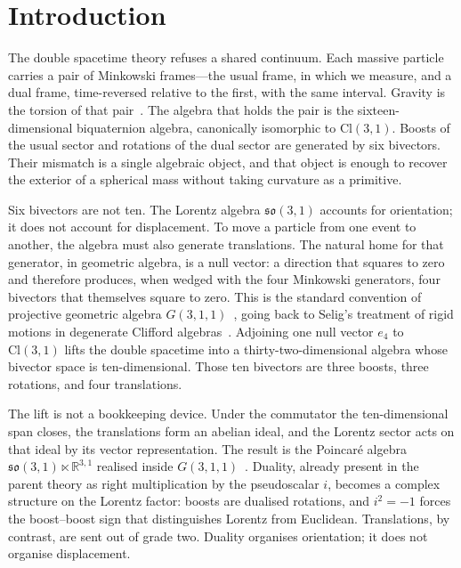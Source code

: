 \documentclass[a4paper]{article}
\begin{document}
\section{Introduction}
\label{sec:introduction}

The double spacetime theory refuses a shared continuum. Each massive particle carries a pair of Minkowski frames---the usual frame, in which we measure, and a dual frame, time-reversed relative to the first, with the same interval. Gravity is the torsion of that pair~\cite{Hestenes2015,DoranLasenby2003}. The algebra that holds the pair is the sixteen-dimensional biquaternion algebra, canonically isomorphic to \(\mathrm{Cl}(3,1)\). Boosts of the usual sector and rotations of the dual sector are generated by six bivectors. Their mismatch is a single algebraic object, and that object is enough to recover the exterior of a spherical mass without taking curvature as a primitive.

Six bivectors are not ten. The Lorentz algebra \(\mathfrak{so}(3,1)\) accounts for orientation; it does not account for displacement. To move a particle from one event to another, the algebra must also generate translations. The natural home for that generator, in geometric algebra, is a null vector: a direction that squares to zero and therefore produces, when wedged with the four Minkowski generators, four bivectors that themselves square to zero. This is the standard convention of projective geometric algebra \(G(3,1,1)\)~\cite{Gunn2017,Lengyel2024,DeKeninckDorst2019,GunnDeKeninck2019}, going back to Selig's treatment of rigid motions in degenerate Clifford algebras~\cite{Selig2005}. Adjoining one null vector \(e_{4}\) to \(\mathrm{Cl}(3,1)\) lifts the double spacetime into a thirty-two-dimensional algebra whose bivector space is ten-dimensional. Those ten bivectors are three boosts, three rotations, and four translations.

The lift is not a bookkeeping device. Under the commutator the ten-dimensional span closes, the translations form an abelian ideal, and the Lorentz sector acts on that ideal by its vector representation. The result is the Poincar\'{e} algebra \(\mathfrak{so}(3,1)\ltimes\mathbb{R}^{3,1}\) realised inside \(G(3,1,1)\)~\cite{Weinberg1995,Tung1985}. Duality, already present in the parent theory as right multiplication by the pseudoscalar \(i\), becomes a complex structure on the Lorentz factor: boosts are dualised rotations, and \(i^{2}=-1\) forces the boost--boost sign that distinguishes Lorentz from Euclidean. Translations, by contrast, are sent out of grade two. Duality organises orientation; it does not organise displacement.
\end{document}
